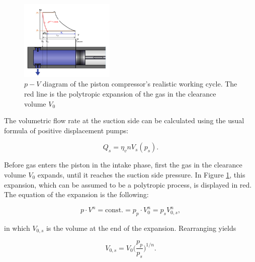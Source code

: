 \begin{figure}[!h]
\begin{center}
\includegraphics[width=0.4\textwidth]{figs/workcycle_real_v3.png}
\caption{\label{pistoncomp_pv2} $p-V$ diagram of the piston compressor's realistic working cycle. The red line is the polytropic expansion of the gas in the clearance volume $V_0$}
\end{center}
\end{figure}

The volumetric flow rate at the suction side can be calculated using the usual formula of positive displacement pumps:

\begin{equation} \label{eq_pistonvolflow1}
Q_s = \eta_v n V_s(p_s).
\end{equation}

Before gas enters the piston in the intake phase, first the gas in the clearance volume $V_0$ expands, until it reaches the suction side pressure. 
In Figure \ref{pistoncomp_pv2}, this expansion, which can be assumed to be a polytropic process, is displayed in red. The equation of the expansion is the following:

\begin{equation}
p\cdot V^n = \mathrm{const.} = p_p \cdot V_0^n =p_s V_{0,s}^n,
\end{equation}

in which $V_{0,s}$ is the volume at the end of the expansion. Rearranging yields

\begin{equation} \label{eq_clearanceexpansion}
V_{0,s} = V_0 \Big(\frac{p_p}{p_s}\Big)^{1/n}.
\end{equation}


